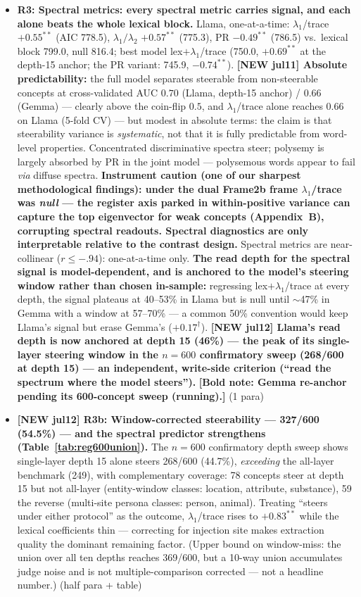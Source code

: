 \documentclass[11pt]{article}
\newenvironment{outline}{\color{gray!70!black}\begin{itemize}[leftmargin=1.2em,itemsep=1pt]}{\end{itemize}\color{black}}
\begin{document}
\begin{outline}
\item \textbf{R3: Spectral metrics: every spectral metric carries signal, and each alone beats the whole lexical block.} Llama, one-at-a-time: $\lambda_1$/trace $+0.55^{**}$ (AIC 778.5), $\lambda_1/\lambda_2$ $+0.57^{**}$ (775.3), PR $-0.49^{**}$ (786.5) vs.\ lexical block 799.0, null 816.4; best model lex$+\lambda_1$/trace (750.0, $+0.69^{**}$ at the depth-15 anchor; the PR variant: 745.9, $-0.74^{**}$). \textbf{[NEW jul11] Absolute predictability:} the full model separates steerable from non-steerable concepts at cross-validated AUC $0.70$ (Llama, depth-15 anchor) / $0.66$ (Gemma) --- clearly above the coin-flip $0.5$, and $\lambda_1$/trace alone reaches $0.66$ on Llama (5-fold CV) --- but modest in absolute terms: the claim is that steerability variance is \emph{systematic}, not that it is fully predictable from word-level properties. Concentrated discriminative spectra steer; polysemy is largely absorbed by PR in the joint model --- polysemous words appear to fail \emph{via} diffuse spectra. \textbf{Instrument caution (one of our sharpest methodological findings): under the dual Frame2b frame $\lambda_1$/trace was \emph{null} --- the register axis parked in within-positive variance can capture the top eigenvector for weak concepts (Appendix~B), corrupting spectral readouts. Spectral diagnostics are only interpretable relative to the contrast design.} Spectral metrics are near-collinear ($r{\le}-.94$): one-at-a-time only. \textbf{The read depth for the spectral signal is model-dependent, and is anchored to the model's steering window rather than chosen in-sample:} regressing lex$+\lambda_1$/trace at every depth, the signal plateaus at 40--53\% in Llama but is null until $\sim$47\% in Gemma with a window at 57--70\% --- a common 50\% convention would keep Llama's signal but erase Gemma's ($+0.17^{\dagger}$). \textbf{[NEW jul12] Llama's read depth is now anchored at depth 15 (46\%) --- the peak of its single-layer steering window in the $n{=}600$ confirmatory sweep (268/600 at depth 15) --- an independent, write-side criterion (``read the spectrum where the model steers'').} \textbf{[Bold note: Gemma re-anchor pending its 600-concept sweep (running).]} (1 para)
\item \textbf{[NEW jul12] R3b: Window-corrected steerability --- 327/600 (54.5\%) --- and the spectral predictor strengthens (Table~\ref{tab:reg600union}).} The $n{=}600$ confirmatory depth sweep shows single-layer depth 15 alone steers 268/600 (44.7\%), \emph{exceeding} the all-layer benchmark (249), with complementary coverage: 78 concepts steer at depth 15 but not all-layer (entity-window classes: location, attribute, substance), 59 the reverse (multi-site persona classes: person, animal). Treating ``steers under either protocol'' as the outcome, $\lambda_1$/trace rises to $+0.83^{**}$ while the lexical coefficients thin --- correcting for injection site makes extraction quality the dominant remaining factor. (Upper bound on window-miss: the union over all ten depths reaches 369/600, but a 10-way union accumulates judge noise and is not multiple-comparison corrected --- not a headline number.) (half para + table)

\end{outline}
\end{document}
